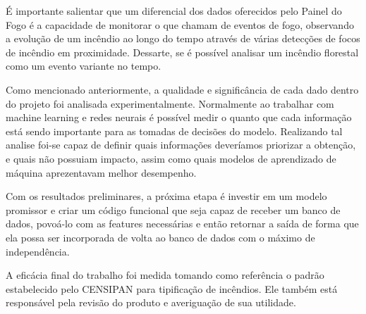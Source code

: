 É importante salientar que um diferencial dos dados oferecidos pelo Painel do Fogo é a capacidade de monitorar o que chamam de eventos de fogo, observando a evolução de um incêndio ao longo do tempo através de várias detecções de focos de incêndio em proximidade. Dessarte, se é possível analisar um incêndio florestal como um evento variante no tempo.


Como mencionado anteriormente, a qualidade e significância de cada dado dentro do projeto foi analisada experimentalmente. Normalmente ao trabalhar com machine learning e redes neurais é possível medir o quanto que cada informação está sendo importante para as tomadas de decisões do modelo. Realizando tal analise foi-se capaz de definir quais informações deveríamos priorizar a obtenção, e quais não possuiam impacto, assim como quais modelos de aprendizado de máquina aprezentavam melhor desempenho.

Com os resultados preliminares, a próxima etapa é investir em um modelo promissor e criar um código funcional que seja capaz de receber um banco de dados, povoá-lo com as features necessárias e então retornar a saída de forma que ela possa ser incorporada de volta ao banco de dados com o máximo de independência.

A eficácia final do trabalho foi medida tomando como referência o padrão estabelecido pelo CENSIPAN para tipificação de incêndios. Ele também está responsável pela revisão do produto e averiguação de sua utilidade.